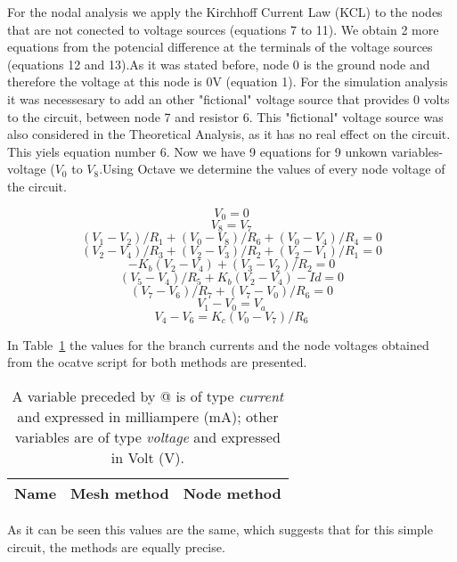For the nodal analysis we apply the Kirchhoff Current Law (KCL) to the nodes that are not conected to voltage sources (equations 7 to 11). We obtain 2 more equations from the potencial difference at the terminals of the voltage sources (equations 12 and 13).As it was stated before, node 0 is the ground node and therefore the voltage at this node is 0V (equation 1). For the simulation analysis it was necessesary to add an other "fictional" voltage source that provides 0 volts to the circuit, between node 7 and resistor 6. This "fictional" voltage source was also considered in the Theoretical Analysis, as it has no real effect on the circuit. This yiels equation number 6. Now we have 9 equations for 9 unkown variables- voltage ({\it$V_{0}$}  to {\it$V_{8}$}.Using Octave we determine the values of every node voltage of the circuit. \par

%
\begin {equation}
	V_0 = 0
	\label{eq:n1}
\end{equation}
\begin {equation}
	V_8 = V_7
	\label{eq:n2}
\end{equation}
\begin {equation}
	(V_1-V_2)/R_1 +(V_0 - V_8)/R_6 + (V_0 - V_4)/R_4 = 0
	\label{eq:n3}
\end{equation}
\begin {equation}
	(V_2-V_4)/R_3 + (V_2-V_3)/R_2 + (V_2-V_1)/R_1 = 0
	\label{eq:n4}
\end{equation}
\begin {equation}
	- K_b(V_2-V_4) + (V_3-V_2)/R_2 = 0
	\label{eq:n5}
\end{equation}
\begin {equation}
	(V_5-V_4)/R_5 + K_b(V_2-V_4) - Id = 0
	\label{eq:n6}
\end{equation}
\begin {equation}
	(V_7-V_6)/R_7 + (V_7 - V_0)/R_6 = 0
	\label{eq:n7}
\end{equation}
\begin {equation}
	V_1 - V_0 = V_a
	\label{eq:n8}
\end{equation}
\begin {equation}
	V_4 - V_6 = K_c  (V_0 - V_7)/R_6
	\label{eq:n9}
\end{equation}




In Table~\ref{tab:theoretical} the values for the branch currents and the node voltages obtained from the ocatve script for both methods are presented.\par 
\begin{table}[h]
  \centering
  \begin{tabular}{|l|r|r|}
    \hline    
    {\bf Name} & {\bf Mesh method} & {\bf Node method}\\ \hline
    
  \end{tabular}
  \caption{A variable preceded by @ is of type {\em current}
    and expressed in milliampere (mA); other variables are of type {\it voltage} and expressed in
    Volt (V).}
  \label{tab:theoretical}
\end{table}

As it can be seen this values are the same, which suggests that for this simple circuit, the methods are equally precise. 
